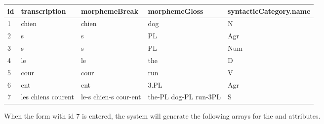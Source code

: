 \documentclass[letterpaper,10pt,english]{sphinxmanual}
\begin{document}
\begin{tabulary}{\linewidth}{|L|L|L|L|L|}
\hline
\textbf{
id
} & \textbf{
transcription
} & \textbf{
morphemeBreak
} & \textbf{
morphemeGloss
} & \textbf{
syntacticCategory.name
}\\\hline

1
 & 
chien
 & 
chien
 & 
dog
 & 
N
\\\hline

2
 & 
s
 & 
s
 & 
PL
 & 
Agr
\\\hline

3
 & 
s
 & 
s
 & 
PL
 & 
Num
\\\hline

4
 & 
le
 & 
le
 & 
the
 & 
D
\\\hline

5
 & 
cour
 & 
cour
 & 
run
 & 
V
\\\hline

6
 & 
ent
 & 
ent
 & 
3.PL
 & 
Agr
\\\hline

7
 & 
les chiens courent
 & 
le-s chien-s cour-ent
 & 
the-PL dog-PL run-3PL
 & 
S
\\\hline
\end{tabulary}


When the form with id 7 is entered, the system will generate the following
arrays for the  and  attributes.
\end{document}
